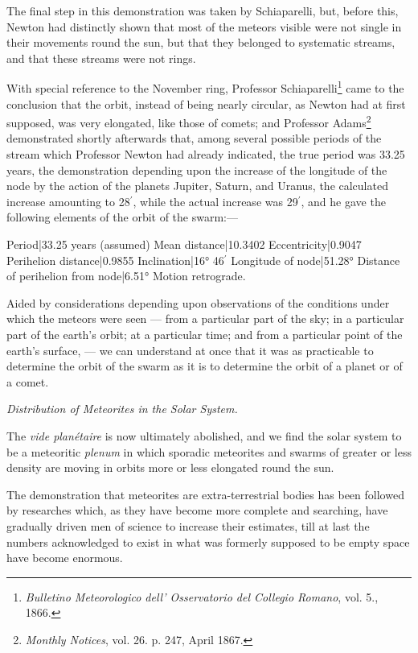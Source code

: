 \documentclass[a4paper, 12pt, oneside, polutonikogreek, english]{article}
\begin{document}
The final step in this demonstration was taken by Schiaparelli, but, before this, Newton had distinctly shown that most of the meteors visible were not single in their movements round the sun, but that they belonged to systematic streams, and that these streams were not rings.

With special reference to the November ring, Professor Schiaparelli\footnote{\emph{Bulletino Meteorologico dell' Osservatorio del Collegio Romano}, vol. 5., 1866.} came to the conclusion that the orbit, instead of being nearly circular, as Newton had at first supposed, was very elongated, like those of comets; and Professor Adams\footnote{\emph{Monthly Notices}, vol. 26. p. 247, April 1867.} demonstrated shortly afterwards that, among several possible periods of the stream which Professor Newton had already indicated, the true period was 33.25 years, the demonstration depending upon the increase of the longitude of the node by the action of the planets Jupiter, Saturn, and Uranus, the calculated increase amounting to 28$^{\prime}$, while the actual increase was 29$^{\prime}$, and he gave the following elements of the orbit of the swarm:---

Period|33.25 years (assumed) 
Mean distance|10.3402 
Eccentricity|0.9047 
Perihelion distance|0.9855 
Inclination|16° 46$^{\prime}$  
Longitude of node|51.28° 
Distance of perihelion from node|6.51° 
Motion retrograde.

Aided by considerations depending upon observations of the conditions under which the meteors were seen --- from a particular part of the sky; in a particular part of the earth's orbit; at a particular time; and from a particular point of the earth's surface, --- we can understand at once that it was as practicable to determine the orbit of the swarm as it is to determine the orbit of a planet or of a comet.

\emph{Distribution of Meteorites in the Solar System.}

The \emph{vide planétaire} is now ultimately abolished, and we find the solar system to be a meteoritic \emph{plenum} in which sporadic meteorites and swarms of greater or less density are moving in orbits more or less elongated round the sun.

The demonstration that meteorites are extra-terrestrial bodies has been followed by researches which, as they have become more complete and searching, have gradually driven men of science to increase their estimates, till at last the numbers acknowledged to exist in what was formerly supposed to be empty space have become enormous.
\end{document}
